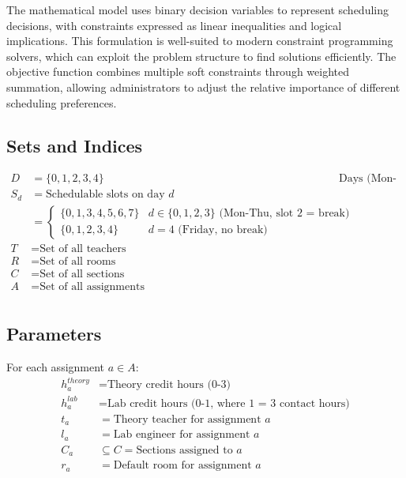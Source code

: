 \documentclass[12pt,a4paper]{article}
\begin{document}
The mathematical model uses binary decision variables to represent scheduling decisions, with constraints expressed as linear inequalities and logical implications. This formulation is well-suited to modern constraint programming solvers, which can exploit the problem structure to find solutions efficiently. The objective function combines multiple soft constraints through weighted summation, allowing administrators to adjust the relative importance of different scheduling preferences.

\subsection{Sets and Indices}

\begin{align*}
D &= \{0, 1, 2, 3, 4\} && \text{Days (Mon-Fri)} \\
S_d &= \text{Schedulable slots on day } d && \\
&= \begin{cases}
\{0,1,3,4,5,6,7\} & d \in \{0,1,2,3\} \text{ (Mon-Thu, slot 2 = break)} \\
\{0,1,2,3,4\} & d = 4 \text{ (Friday, no break)}
\end{cases} \\
T &= \text{Set of all teachers} \\
R &= \text{Set of all rooms} \\
C &= \text{Set of all sections} \\
A &= \text{Set of all assignments} \\
\end{align*}

\subsection{Parameters}

For each assignment $a \in A$:
\begin{align*}
h_a^{theory} &= \text{Theory credit hours (0-3)} \\
h_a^{lab} &= \text{Lab credit hours (0-1, where 1 = 3 contact hours)} \\
t_a &= \text{Theory teacher for assignment } a \\
l_a &= \text{Lab engineer for assignment } a \\
C_a &\subseteq C = \text{Sections assigned to } a \\
r_a &= \text{Default room for assignment } a \\
\end{align*}
\end{document}

